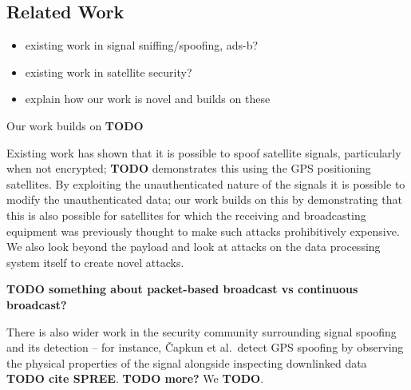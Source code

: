 \subsection{Related Work}

% 
\begin{itemize}
    \item existing work in signal sniffing/spoofing, ads-b?
    \item existing work in satellite security?
    \item explain how our work is novel and builds on these
\end{itemize}

Our work builds on \textbf{TODO}

Existing work has shown that it is possible to spoof satellite signals, particularly when not encrypted; \textbf{TODO} demonstrates this using the GPS positioning satellites.
By exploiting the unauthenticated nature of the signals it is possible to modify the unauthenticated data; our work builds on this by demonstrating that this is also possible for satellites for which the receiving and broadcasting equipment was previously thought to make such attacks prohibitively expensive.
We also look beyond the payload and look at attacks on the data processing system itself to create novel attacks.

\textbf{TODO something about packet-based broadcast vs continuous broadcast?}

There is also wider work in the security community surrounding signal spoofing and its detection -- for instance, Čapkun et al.\ detect GPS spoofing by observing the physical properties of the signal alongside inspecting downlinked data \textbf{TODO cite SPREE}.
\textbf{TODO more?}
We \textbf{TODO}.



